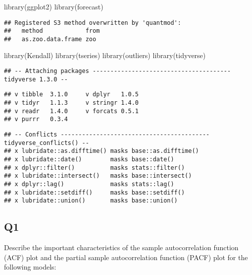\documentclass[
]{article}
\newenvironment{Shaded}{\begin{snugshade}}{\end{snugshade}}
\newcommand{\FunctionTok}[1]{\textcolor[rgb]{0.00,0.00,0.00}{#1}}
\newcommand{\NormalTok}[1]{#1}
\begin{document}
\begin{Shaded}
\begin{Highlighting}[]
\FunctionTok{library}\NormalTok{(ggplot2)}
\FunctionTok{library}\NormalTok{(forecast)  }
\end{Highlighting}
\end{Shaded}

\begin{verbatim}
## Registered S3 method overwritten by 'quantmod':
##   method            from
##   as.zoo.data.frame zoo
\end{verbatim}

\begin{Shaded}
\begin{Highlighting}[]
\FunctionTok{library}\NormalTok{(Kendall)}
\FunctionTok{library}\NormalTok{(tseries)}
\FunctionTok{library}\NormalTok{(outliers)}
\FunctionTok{library}\NormalTok{(tidyverse)}
\end{Highlighting}
\end{Shaded}

\begin{verbatim}
## -- Attaching packages --------------------------------------- tidyverse 1.3.0 --
\end{verbatim}

\begin{verbatim}
## v tibble  3.1.0     v dplyr   1.0.5
## v tidyr   1.1.3     v stringr 1.4.0
## v readr   1.4.0     v forcats 0.5.1
## v purrr   0.3.4
\end{verbatim}

\begin{verbatim}
## -- Conflicts ------------------------------------------ tidyverse_conflicts() --
## x lubridate::as.difftime() masks base::as.difftime()
## x lubridate::date()        masks base::date()
## x dplyr::filter()          masks stats::filter()
## x lubridate::intersect()   masks base::intersect()
## x dplyr::lag()             masks stats::lag()
## x lubridate::setdiff()     masks base::setdiff()
## x lubridate::union()       masks base::union()
\end{verbatim}

\hypertarget{q1}{%
\subsection{Q1}\label{q1}}

Describe the important characteristics of the sample autocorrelation
function (ACF) plot and the partial sample autocorrelation function
(PACF) plot for the following models:
\end{document}

